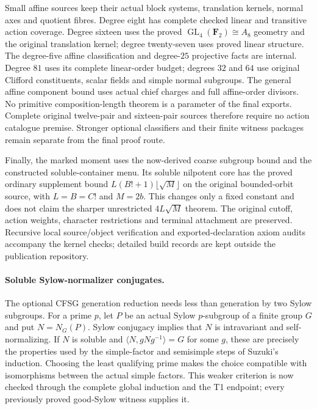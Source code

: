 Small affine sources keep their actual block systems, translation kernels,
normal axes and quotient fibres. Degree eight has complete checked linear
and transitive action coverage. Degree sixteen uses the proved
$\operatorname{GL}_4(\mathbf F_2)\cong A_8$ geometry and the original
translation kernel; degree twenty-seven uses proved linear structure.
The degree-five affine classification and degree-$25$ projective facts are internal. Degree $81$ uses its complete linear-order budget; degrees $32$ and $64$ use original Clifford constituents, scalar fields and simple normal subgroups. The general affine component bound uses actual chief charges and full affine-order divisors. No primitive composition-length theorem is a parameter of the final exports. Complete
original twelve-pair and sixteen-pair sources therefore require no action
catalogue premise. Stronger optional classifiers and their finite witness
packages remain separate from the final proof route.

Finally, the marked moment uses the now-derived coarse subgroup bound and the constructed soluble-container menu. Its soluble nilpotent core has the proved
ordinary supplement bound $L(B!+1)\lfloor\sqrt M\rfloor$ on the original
bounded-orbit source, with $L=B=C!$ and $M=2b$. This changes only a fixed
constant and does not claim the sharper unrestricted $4L\sqrt M$ theorem.
The original cutoff, action weights, character restrictions and terminal
attachment are preserved. Recursive local source/object verification and
exported-declaration axiom audits accompany the kernel checks; detailed
build records are kept outside the publication repository.

\paragraph{Soluble Sylow-normalizer conjugates.}
The optional CFSG generation reduction needs less than generation by two
Sylow subgroups. For a prime $p$, let $P$ be an actual Sylow $p$-subgroup
of a finite group $G$ and put $N=N_G(P)$. Sylow conjugacy implies that
$N$ is intravariant and self-normalizing. If $N$ is soluble and
$\langle N,gNg^{-1}\rangle=G$ for some $g$, these are precisely the
properties used by the simple-factor and semisimple steps of Suzuki's
induction. Choosing the least qualifying prime makes the choice
compatible with isomorphisms between the actual simple factors. This
weaker criterion is now checked through the complete global induction
and the T1 endpoint; every previously proved good-Sylow witness supplies it.

